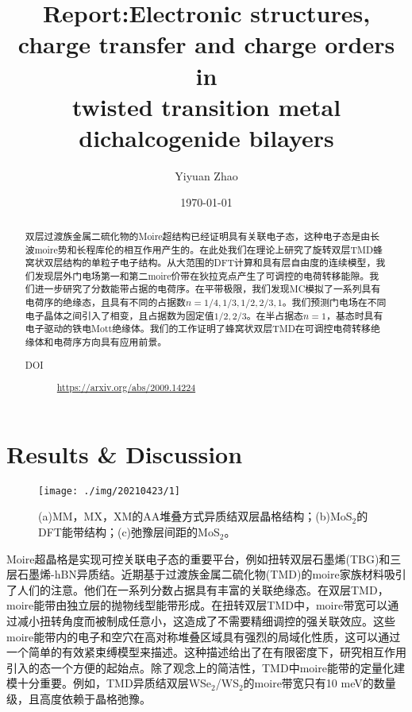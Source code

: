 \documentclass[reprint, aps, prb, showkeys]{revtex4-2}
\begin{document}
\title{Report:Electronic structures, charge transfer and charge orders in \\
twisted transition metal dichalcogenide bilayers}

\author{Yiyuan Zhao}
\date{\today}

\begin{abstract}
双层过渡族金属二硫化物的Moire超结构已经证明具有关联电子态，这种电子态是由长波moire势和长程库伦的相互作用产生的。在此处我们在理论上研究了旋转双层TMD蜂窝状双层结构的单粒子电子结构。从大范围的DFT计算和具有层自由度的连续模型，我们发现层外门电场第一和第二moire价带在狄拉克点产生了可调控的电荷转移能隙。我们进一步研究了分数能带占据的电荷序。在平带极限，我们发现MC模拟了一系列具有电荷序的绝缘态，且具有不同的占据数$n = 1/4, 1/3, 1/2, 2/3, 1$。我们预测门电场在不同电子晶体之间引入了相变，且占据数为固定值$1/2, 2/3$。在半占据态$n = 1$，基态时具有电子驱动的铁电Mott绝缘体。我们的工作证明了蜂窝状双层TMD在可调控电荷转移绝缘体和电荷序方向具有应用前景。
\begin{description}
    \item[DOI] \url{https://arxiv.org/abs/2009.14224}
\end{description}
\end{abstract}


\maketitle

\section{Results \& Discussion}
\begin{figure}[t]
    \texttt{[image: ./img/20210423/1]}
    \caption{\label{fig:structure} 
    (a)MM，MX，XM的AA堆叠方式异质结双层晶格结构；(b)MoS$_2$的DFT能带结构；(c)弛豫层间距的MoS$_2$。
    }
\end{figure}
Moire超晶格是实现可控关联电子态的重要平台，例如扭转双层石墨烯(TBG)和三层石墨烯-hBN异质结。近期基于过渡族金属二硫化物(TMD)的moire家族材料吸引了人们的注意。他们在一系列分数占据具有丰富的关联绝缘态。在双层TMD，moire能带由独立层的抛物线型能带形成。在扭转双层TMD中，moire带宽可以通过减小扭转角度而被制成任意小，这造成了不需要精细调控的强关联效应。这些moire能带内的电子和空穴在高对称堆叠区域具有强烈的局域化性质，这可以通过一个简单的有效紧束缚模型来描述。这种描述给出了在有限密度下，研究相互作用引入的态一个方便的起始点。除了观念上的简洁性，TMD中moire能带的定量化建模十分重要。例如，TMD异质结双层WSe$_2$/WS$_2$的moire带宽只有10 meV的数量级，且高度依赖于晶格弛豫。
\end{document}
